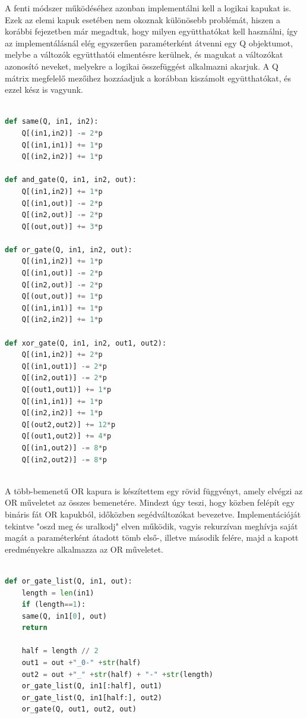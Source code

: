 A fenti módszer működéséhez azonban implementálni kell a logikai kapukat is.
Ezek az elemi kapuk esetében nem okoznak különösebb problémát, hiszen a korábbi fejezetben már megadtuk, hogy milyen együtthatókat kell használni, így az implementálásnál elég egyszerűen paraméterként átvenni egy Q objektumot, melybe a változók együtthatói elmentésre kerülnek, és magukat a változókat azonosító neveket, melyekre a logikai összefüggést alkalmazni akarjuk. A Q mátrix megfelelő mezőihez hozzáadjuk a korábban kiszámolt együtthatókat, és ezzel kész is vagyunk.

\begin{lstlisting}[language=python,caption=Elemi kapuk,label=code:ElementaryGates]
	
def same(Q, in1, in2):
	Q[(in1,in2)] -= 2*p
	Q[(in1,in1)] += 1*p
	Q[(in2,in2)] += 1*p

def and_gate(Q, in1, in2, out):
	Q[(in1,in2)] += 1*p
	Q[(in1,out)] -= 2*p
	Q[(in2,out)] -= 2*p
	Q[(out,out)] += 3*p

def or_gate(Q, in1, in2, out):
	Q[(in1,in2)] += 1*p
	Q[(in1,out)] -= 2*p
	Q[(in2,out)] -= 2*p
	Q[(out,out)] += 1*p
	Q[(in1,in1)] += 1*p
	Q[(in2,in2)] += 1*p

def xor_gate(Q, in1, in2, out1, out2):
	Q[(in1,in2)] += 2*p
	Q[(in1,out1)] -= 2*p
	Q[(in2,out1)] -= 2*p
	Q[(out1,out1)] += 1*p
	Q[(in1,in1)] += 1*p
	Q[(in2,in2)] += 1*p
	Q[(out2,out2)] += 12*p
	Q[(out1,out2)] += 4*p
	Q[(in1,out2)] -= 8*p
	Q[(in2,out2)] -= 8*p
	
\end{lstlisting}

A több-bemenetű OR kapura is készítettem egy rövid függvényt, amely elvégzi az OR műveletet az összes bemenetére. Mindezt úgy teszi, hogy közben felépít egy bináris fát OR kapukból, időközben segédváltozókat bevezetve. Implementációját tekintve "oszd meg és uralkodj" elven működik, vagyis rekurzívan meghívja saját magát a paraméterként átadott tömb első-, illetve második felére, majd a kapott eredményekre alkalmazza az OR műveletet.

\begin{lstlisting}[language=python,caption=Elemi kapuk,label=code:MultipleOrGates]
	
def or_gate_list(Q, in1, out):
	length = len(in1)
	if (length==1):
	same(Q, in1[0], out)
	return
	
	half = length // 2
	out1 = out +"_0-" +str(half)  
	out2 = out +"_" +str(half) + "-" +str(length)
	or_gate_list(Q, in1[:half], out1)
	or_gate_list(Q, in1[half:], out2)
	or_gate(Q, out1, out2, out)
	
\end{lstlisting}

